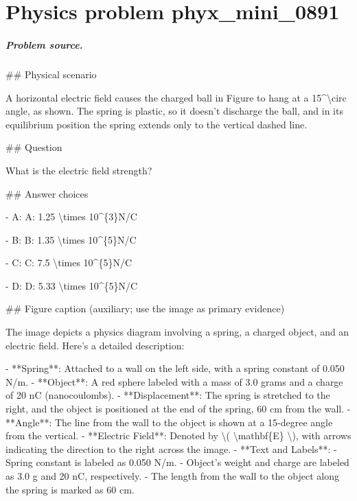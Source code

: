 
\chapter{Physics problem phyx\_mini\_0891}
\label{ch:PhyXMiniProblems_problem_phyx_mini_0891}

\paragraph{Problem source.}
\#\# Physical scenario

A horizontal electric field causes the charged ball in Figure to hang at a 15\textasciicircum{}\textbackslash{}circ angle, as shown. The spring is plastic, so it doesn’t discharge the ball, and in its equilibrium position the spring extends only to the vertical dashed line.

\#\# Question

What is the electric field strength?

\#\# Answer choices

- A: A: 1.25 \textbackslash{}times 10\textasciicircum{}\{3\}N/C

- B: B: 1.35 \textbackslash{}times 10\textasciicircum{}\{5\}N/C

- C: C: 7.5 \textbackslash{}times 10\textasciicircum{}\{5\}N/C

- D: D: 5.33 \textbackslash{}times 10\textasciicircum{}\{5\}N/C

\#\# Figure caption (auxiliary; use the image as primary evidence)

The image depicts a physics diagram involving a spring, a charged object, and an electric field. Here's a detailed description:

- **Spring**: Attached to a wall on the left side, with a spring constant of 0.050 N/m.
- **Object**: A red sphere labeled with a mass of 3.0 grams and a charge of 20 nC (nanocoulombs).
- **Displacement**: The spring is stretched to the right, and the object is positioned at the end of the spring, 60 cm from the wall.
- **Angle**: The line from the wall to the object is shown at a 15-degree angle from the vertical.
- **Electric Field**: Denoted by \textbackslash{}( \textbackslash{}mathbf\{E\} \textbackslash{}), with arrows indicating the direction to the right across the image.
- **Text and Labels**: 
  - Spring constant is labeled as 0.050 N/m.
  - Object's weight and charge are labeled as 3.0 g and 20 nC, respectively.
  - The length from the wall to the object along the spring is marked as 60 cm.

